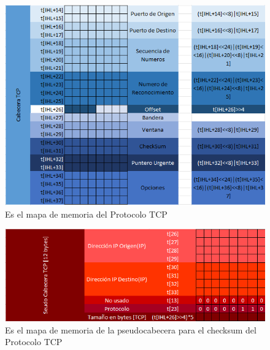 	\begin{figure}[h]
			\centering		
			\includegraphics[width=\textwidth]{MapaMemoriaTCP}
			\caption{Es el mapa de memoria del Protocolo TCP}
	\end{figure}
	\begin{figure}[h]
			\centering		
			\includegraphics[width=\textwidth]{MapaMemoriaPTCP}
			\caption{Es el mapa de memoria de la pseudocabecera para el checksum del Protocolo TCP}
	\end{figure}

